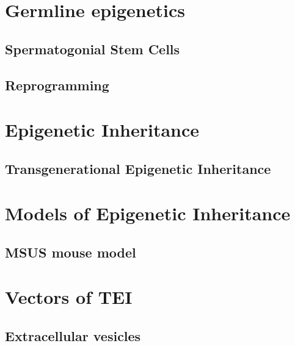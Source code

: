\documentclass[12pt,twoside]{reedthesis}
\begin{document}
\hypertarget{germline-epigenetics}{%
\section{Germline epigenetics}\label{germline-epigenetics}}

\hypertarget{spermatogonial-stem-cells}{%
\subsection{Spermatogonial Stem Cells}\label{spermatogonial-stem-cells}}

\hypertarget{reprogramming}{%
\subsection{Reprogramming}\label{reprogramming}}

\hypertarget{epigenetic-inheritance}{%
\section{Epigenetic Inheritance}\label{epigenetic-inheritance}}

\hypertarget{transgenerational-epigenetic-inheritance}{%
\subsection{Transgenerational Epigenetic Inheritance}\label{transgenerational-epigenetic-inheritance}}

\hypertarget{models-of-epigenetic-inheritance}{%
\section{Models of Epigenetic Inheritance}\label{models-of-epigenetic-inheritance}}

\hypertarget{msus-mouse-model}{%
\subsection{MSUS mouse model}\label{msus-mouse-model}}

\hypertarget{vectors-of-tei}{%
\section{Vectors of TEI}\label{vectors-of-tei}}

\hypertarget{extracellular-vesicles}{%
\subsection{Extracellular vesicles}\label{extracellular-vesicles}}
\end{document}
